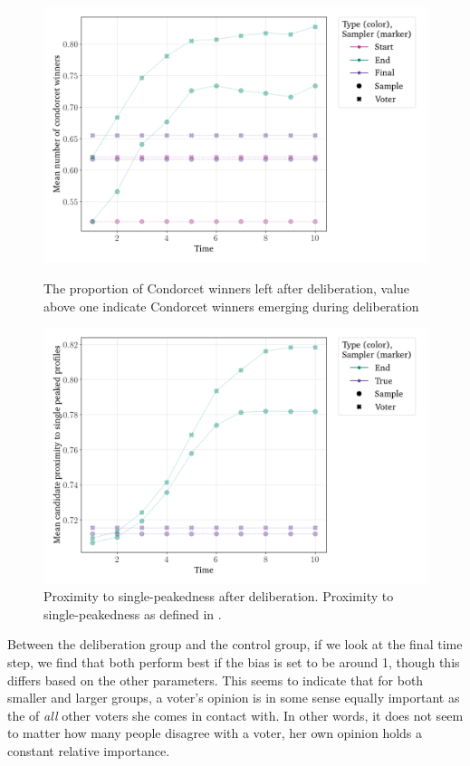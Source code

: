 \begin{figure}[htbp]
	\begin{minipage}{0.45\textwidth}
		\centering
		\includegraphics[width=\textwidth]{Figures/delib_Mean number of Condorcet winners.png}
		\caption{The proportion of Condorcet winners left after deliberation, value above one indicate Condorcet winners emerging during deliberation}
		\label{fig:degroot_condorcet}
	\end{minipage}\hfill
	\begin{minipage}{0.45\textwidth}
		\centering
		\vspace{-9pt}
		\includegraphics[width=\textwidth]{Figures/delib_Mean candidate proximity to single peaked Profiles.png}
		\caption{Proximity to single-peakedness after deliberation. Proximity to single-peakedness as defined in .}
		\label{fig:degroot_single_peaked}
	\end{minipage}
\end{figure}

Between the deliberation group and the control group, if we look at the final
time step, we find that both perform best if the bias is set to be around 1,
though this differs based on the other parameters. This seems to indicate that
for both smaller and larger groups, a voter's opinion is in some sense equally
important as the of  \textit{all} other voters she comes in contact with. In
other words, it does not seem to matter how many people disagree with a voter,
her own opinion holds a constant relative importance.
